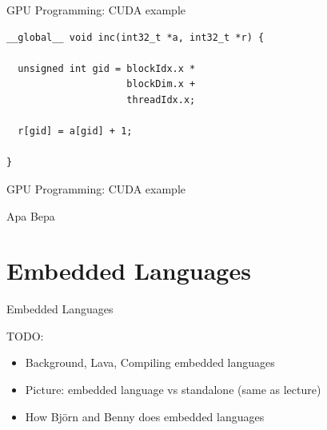 \documentclass[xcolor=dvipsnames]{beamer}
\begin{document}
%
\begin{frame}[fragile]{GPU Programming: CUDA example}

\begin{block}{}
\begin{verbatim} 
__global__ void inc(int32_t *a, int32_t *r) {
  
  unsigned int gid = blockIdx.x * 
                     blockDim.x + 
                     threadIdx.x;

  r[gid] = a[gid] + 1; 

} 
\end{verbatim}
\end{block} 


\end{frame} 

%
\begin{frame}[fragile]{GPU Programming: CUDA example}

\begin{block}{}
Apa Bepa  
\end{block} 


\end{frame} 


%
\section{Embedded Languages}

\begin{frame}{Embedded Languages} 
  
  TODO: 
  \begin{itemize} 
    \item Background, Lava, Compiling embedded languages 
    \item Picture: embedded language vs standalone (same as lecture) 
    \item How Bj\"orn and Benny does embedded languages 
  \end{itemize}
  
\end{frame} 

%
\end{document}
